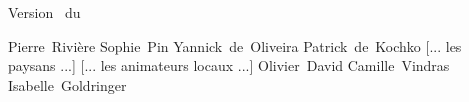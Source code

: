 





\graphicspath{{../ressources/figures/}}




%
%
%
%
%
%
%



\pagestyle{empty}

\begin{center}


\vfill

\large
Version \versionCF~du \dateversionCF

\vfill

\normalsize

Pierre~Rivière \hspace{.5cm}
Sophie~Pin \hspace{.5cm}
Yannick~de~Oliveira \hspace{.5cm}
Patrick~de~Kochko \hspace{.5cm}
[... les paysans ...] \hspace{.5cm}
[... les animateurs locaux ...] \hspace{.5cm}
Olivier~David \hspace{.5cm}
Camille~Vindras \hspace{.5cm}
Isabelle~Goldringer \\
\end{center}


